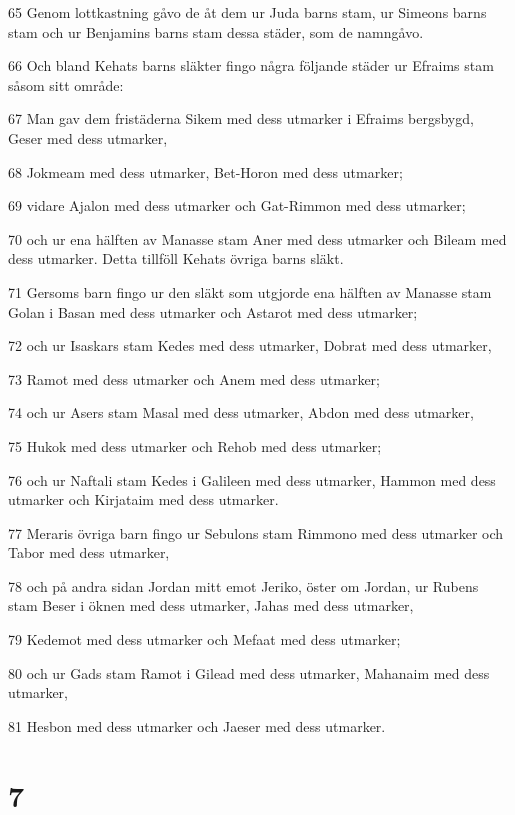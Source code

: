 \par 65 Genom lottkastning gåvo de åt dem ur Juda barns stam, ur Simeons barns stam och ur Benjamins barns stam dessa städer, som de namngåvo.
\par 66 Och bland Kehats barns släkter fingo några följande städer ur Efraims stam såsom sitt område:
\par 67 Man gav dem fristäderna Sikem med dess utmarker i Efraims bergsbygd, Geser med dess utmarker,
\par 68 Jokmeam med dess utmarker, Bet-Horon med dess utmarker;
\par 69 vidare Ajalon med dess utmarker och Gat-Rimmon med dess utmarker;
\par 70 och ur ena hälften av Manasse stam Aner med dess utmarker och Bileam med dess utmarker. Detta tillföll Kehats övriga barns släkt.
\par 71 Gersoms barn fingo ur den släkt som utgjorde ena hälften av Manasse stam Golan i Basan med dess utmarker och Astarot med dess utmarker;
\par 72 och ur Isaskars stam Kedes med dess utmarker, Dobrat med dess utmarker,
\par 73 Ramot med dess utmarker och Anem med dess utmarker;
\par 74 och ur Asers stam Masal med dess utmarker, Abdon med dess utmarker,
\par 75 Hukok med dess utmarker och Rehob med dess utmarker;
\par 76 och ur Naftali stam Kedes i Galileen med dess utmarker, Hammon med dess utmarker och Kirjataim med dess utmarker.
\par 77 Meraris övriga barn fingo ur Sebulons stam Rimmono med dess utmarker och Tabor med dess utmarker,
\par 78 och på andra sidan Jordan mitt emot Jeriko, öster om Jordan, ur Rubens stam Beser i öknen med dess utmarker, Jahas med dess utmarker,
\par 79 Kedemot med dess utmarker och Mefaat med dess utmarker;
\par 80 och ur Gads stam Ramot i Gilead med dess utmarker, Mahanaim med dess utmarker,
\par 81 Hesbon med dess utmarker och Jaeser med dess utmarker.

\chapter{7}

